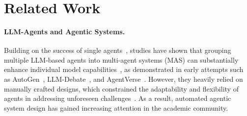 \documentclass{article}
\theoremstyle{plain}
\theoremstyle{definition}
\theoremstyle{remark}
\begin{document}
\section{Related Work}
\vspace{-0.3em}
\paragraph{LLM-Agents and Agentic Systems.}
Building on the success of single agents~\citep{shen2024hugginggpt,zhu2024knowagent,zhong2024memorybank}, studies have shown that grouping multiple LLM-based agents into multi-agent systems (MAS) can substantially enhance individual model capabilities~\citep{FCS2024_Survey-Agent}, as demonstrated in early attempts such as AutoGen~\citep{autogen}, LLM-Debate~\citep{arXiv2023_MultiAgent-Debate}, and AgentVerse~\citep{chen2023agentverse}. %
However, they heavily relied on manually crafted designs, which constrained the adaptability and flexibility of agents in addressing unforeseen challenges~\citep{he2023lego,chen2023agentverse}. As a result, automated agentic system design has gained increasing attention in the academic community.




\vspace{-0.6em}
\end{document}
